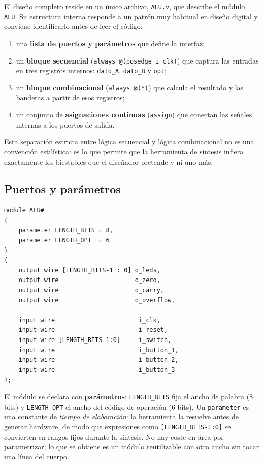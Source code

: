 \documentclass[12pt,a4paper]{article}
\begin{document}
El diseño completo reside en un único archivo, \texttt{ALU.v}, que describe el módulo
\texttt{ALU}. Su estructura interna responde a un patrón muy habitual en diseño digital y
conviene identificarlo antes de leer el código:

\begin{enumerate}[leftmargin=1.6em]
  \item una \textbf{lista de puertos y parámetros} que define la interfaz;
  \item un \textbf{bloque secuencial} (\texttt{always @(posedge i\_clk)}) que captura las
        entradas en tres registros internos: \texttt{dato\_A}, \texttt{dato\_B} y
        \texttt{opt};
  \item un \textbf{bloque combinacional} (\texttt{always @(*)}) que calcula el resultado y
        las banderas a partir de esos registros;
  \item un conjunto de \textbf{asignaciones continuas} (\texttt{assign}) que conectan las
        señales internas a los puertos de salida.
\end{enumerate}

Esta separación estricta entre lógica secuencial y lógica combinacional no es una
convención estilística: es lo que permite que la herramienta de síntesis infiera exactamente
los biestables que el diseñador pretende y ni uno más.

\subsection{Puertos y parámetros}

\begin{lstlisting}[caption={Declaración del módulo: parámetros y puertos.},label={lst:ports}]
module ALU#
(
    parameter LENGTH_BITS = 8,
    parameter LENGTH_OPT  = 6
)
(
    output wire [LENGTH_BITS-1 : 0] o_leds,
    output wire                     o_zero,
    output wire                     o_carry,
    output wire                     o_overflow,

    input wire                       i_clk,
    input wire                       i_reset,
    input wire [LENGTH_BITS-1:0]     i_switch,
    input wire                       i_button_1,
    input wire                       i_button_2,
    input wire                       i_button_3
);
\end{lstlisting}

El módulo se declara con \textbf{parámetros}: \texttt{LENGTH\_BITS} fija el ancho de palabra
(8 bits) y \texttt{LENGTH\_OPT} el ancho del código de operación (6 bits). Un
\texttt{parameter} es una constante de \emph{tiempo de elaboración}: la herramienta la
resuelve antes de generar hardware, de modo que expresiones como
\texttt{[LENGTH\_BITS-1:0]} se convierten en rangos fijos durante la síntesis. No hay coste
en área por parametrizar; lo que se obtiene es un módulo reutilizable con otro ancho sin
tocar una línea del cuerpo.
\end{document}
